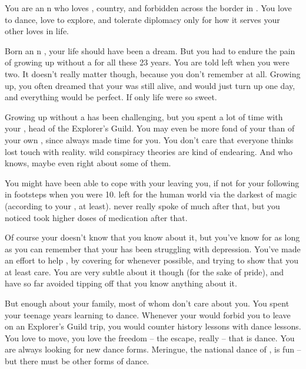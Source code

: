 \documentclass[char]{NeptuneBall}
\begin{document}
\name{\cPrincess{}}


You are an \pAtlantis{}n \cPrincess{\prince} who loves \cPrincess{\their} \cKing{\parent}, \cPrincess{\their} country, and \cPrincess{\their} forbidden \cDiplomat{\paramour} across the border in \pPacifica{}. You love to dance, love to explore, and tolerate diplomacy only for how it serves your other loves in life.

Born an \pAtlantis{}n \cPrincess{\prince}, your life should have been a dream. But you had to endure the pain of growing up without a \cQueen{\parent} for all these 23 years. You are told \cQueen{\they} left when you were two. It doesn't really matter though, because you don't remember \cQueen{\them} at all. Growing up, you often dreamed that your \cQueen{\parent} was still alive, and would just turn up one day, and everything would be perfect. If only life were so sweet.

Growing up without a \cQueen{\parent} has been challenging, but you spent a lot of time with your \cPlant{\uncle} \cPlant{}, head of the Explorer's Guild. You may even be more fond of your \cPlant{\uncle} than of your own \cKing{\parent}, since \cPlant{} always made time for you. You don't care that everyone thinks \cPlant{\they} \cPlant{\have} lost touch with reality. \cPlant{\Their} wild conspiracy theories are kind of endearing. And who knows, maybe \cPlant{\they} \cPlant{\are} even right about some of them.

You might have been able to cope with your \cQueen{\parent} leaving you, if not for your \cAriel{\sibling} following in \cQueen{\their} footsteps when you were 10. \cAriel{} left for the human world via the darkest of magic (according to your \cKing{\parent}, at least). \cKing{\They} never really spoke of \cAriel{\them} much after that, but you noticed \cKing{\they} took higher doses of \cKing{\their} medication after that.

Of course your \cKing{\parent} doesn't know that you know about it, but you've know for as long as you can remember that your \cKing{\parent} has been struggling with depression. You've made an effort to help \cKing{\them}, by covering for \cKing{\them} whenever possible, and trying to show \cKing{\them} that you at least care. You are very subtle about it though (for the sake of \cKing{\their} pride), and have so far avoided tipping \cKing{\them} off that you know anything about it.

But enough about your family, most of whom don't care about you. You spent your teenage years learning to dance. Whenever your \cKing{\parent} would forbid you to leave on an Explorer's Guild trip, you would counter \cKing{\them} history lessons with dance lessons.  You love to move, you love the freedom -- the escape, really -- that is dance. You are always looking for new dance forms. Meringue, the national dance of \pAtlantis{}, is fun -- but there must be other forms of dance.
\end{document}
